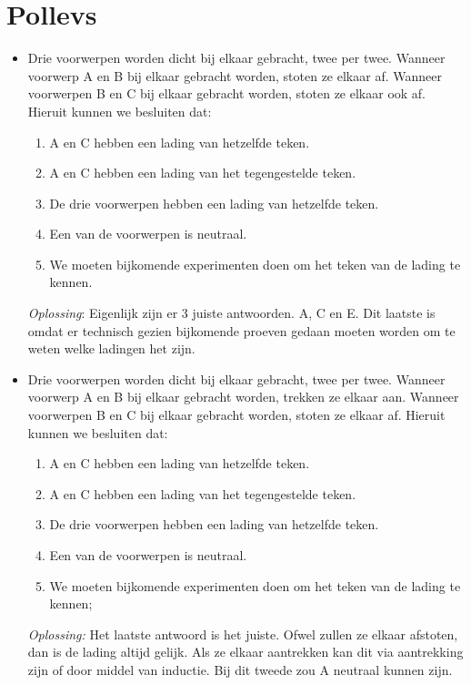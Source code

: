 \documentclass[12pt,a4paper]{article}
\begin{document}
    \section{Pollevs}
    \begin{itemize}
    \renewcommand\labelitemi{--}
    \item Drie voorwerpen worden dicht bij elkaar gebracht, twee per twee. Wanneer voorwerp A en B bij elkaar gebracht worden, stoten ze elkaar af. Wanneer voorwerpen B en C bij elkaar gebracht worden, stoten ze elkaar ook af. Hieruit kunnen we besluiten dat:
    \begin{enumerate}[label=\alph*]
    	\item A en C hebben een lading van hetzelfde teken.
    	\item A en C hebben een lading van het tegengestelde teken.
    	\item De drie voorwerpen hebben een lading van hetzelfde teken. 
    	\item Een van de voorwerpen is neutraal. 
    	\item We moeten bijkomende experimenten doen om het teken van de lading te kennen. 
    \end{enumerate}
	\textit{Oplossing}: Eigenlijk zijn er 3 juiste antwoorden. A, C en E. Dit laatste is omdat er technisch gezien bijkomende proeven gedaan moeten worden om te weten welke ladingen het zijn. 
	\newline
	\item Drie voorwerpen worden dicht bij elkaar gebracht, twee per twee. Wanneer voorwerp A en B bij elkaar gebracht worden, trekken ze elkaar aan. Wanneer voorwerpen B en C bij elkaar gebracht worden, stoten ze elkaar af. Hieruit kunnen we besluiten dat: 
	\begin{enumerate}[label=\alph*]
		\item A en C hebben een lading van hetzelfde teken. 
		\item A en C hebben een lading van het tegengestelde teken. 
		\item De drie voorwerpen hebben een lading van hetzelfde teken. 
		\item Een van de voorwerpen is neutraal. 
		\item We moeten bijkomende experimenten doen om het teken van de lading te kennen; 
	\end{enumerate}
	\textit{Oplossing:} Het laatste antwoord is het juiste. Ofwel zullen ze elkaar afstoten, dan is de lading altijd gelijk. Als ze elkaar aantrekken kan dit via aantrekking zijn of door middel van inductie. Bij dit tweede zou A neutraal kunnen zijn. 

\end{itemize}
\end{document}
